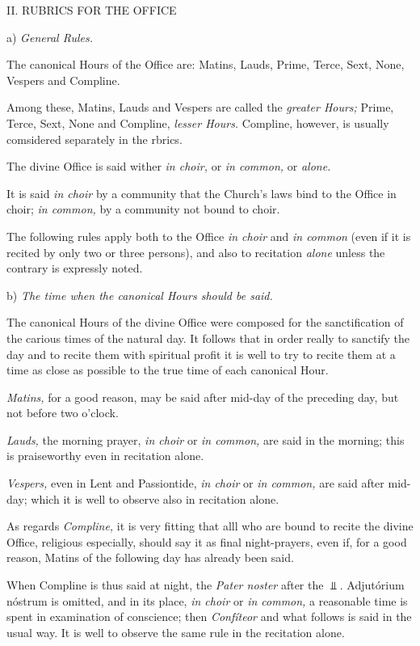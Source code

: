 II. RUBRICS FOR THE OFFICE

a) {\it General Rules.}

The canonical Hours of the Office are: Matins, Lauds, Prime, Terce, Sext, None, Vespers and Compline.

Among these, Matins, Lauds and Vespers are called the {\it greater Hours;} Prime, Terce, Sext, None and Compline, {\it lesser Hours.} Compline, however, is usually comsidered separately in the rbrics.

The divine Office is said wither {\it in choir,} or {\it in common,} or {\it alone.}

It is said {\it in choir} by a community that the Church's laws bind to the Office in choir; {\it in common,} by a community not bound to choir.

The following rules apply both to the Office {\it in choir} and {\it in common} (even if it is recited by only two or three persons), and also to recitation {\it alone} unless the contrary is expressly noted.

b) {\it The time when the canonical Hours should be said.}

The canonical Hours of the divine Office were composed for the sanctification of the carious times of the natural day. It follows that in order really to sanctify the day and to recite them with spiritual profit it is well to try to recite them at a time as close as possible to the true time of each canonical Hour.

{\it Matins,} for a good reason, may be said after mid-day of the preceding day, but not before two o'clock.

{\it Lauds,} the morning prayer, {\it in choir} or {\it in common,} are said in the morning; this is praiseworthy even in recitation alone.

{\it Vespers,} even in Lent and Passiontide, {\it in choir} or {\it in common,} are said after mid-day; which it is well to observe also in recitation alone.

As regards {\it Compline,} it is very fitting that alll who are bound to recite the divine Office, religious especially, should say it as final night-prayers, even if, for a good reason, Matins of the following day has already been said.

When Compline is thus said at night, the {\it Pater noster} after the $\Vbar.$ {Adjutórium nóstrum} is omitted, and in its place, {\it in choir} or {\it in common,} a reasonable time is spent in examination of conscience; then {\it Confíteor} and what follows is said in the usual way. It is well to observe the same rule in the recitation alone.

